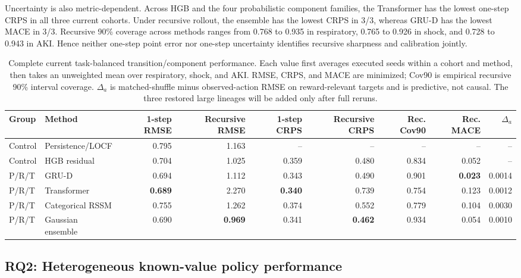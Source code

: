 \documentclass[sigconf,review]{acmart}
\begin{document}
Uncertainty is also metric-dependent. Across HGB and the four probabilistic component families, the Transformer has the lowest one-step CRPS in all three current cohorts. Under recursive rollout, the ensemble has the lowest CRPS in 3/3, whereas GRU-D has the lowest MACE in 3/3. Recursive 90\% coverage across methods ranges from 0.768 to 0.935 in respiratory, 0.765 to 0.926 in shock, and 0.728 to 0.943 in AKI. Hence neither one-step point error nor one-step uncertainty identifies recursive sharpness and calibration jointly.

\begin{table}[t]
\centering
\caption{Complete current task-balanced transition/component performance. Each value first averages executed seeds within a cohort and method, then takes an unweighted mean over respiratory, shock, and AKI. RMSE, CRPS, and MACE are minimized; Cov90 is empirical recursive 90\% interval coverage. $\Delta_a$ is matched-shuffle minus observed-action RMSE on reward-relevant targets and is predictive, not causal. The three restored large lineages will be added only after full reruns.}
\label{tab:all-models}
\scriptsize
\begin{tabular}{llrrrrrrr}
\toprule
Group & Method & 1-step RMSE & Recursive RMSE & 1-step CRPS & Recursive CRPS & Rec. Cov90 & Rec. MACE & $\Delta_a$ \\
\midrule
Control & Persistence/LOCF & 0.795 & 1.163 & -- & -- & -- & -- & -- \\
Control & HGB residual & 0.704 & 1.025 & 0.359 & 0.480 & 0.834 & 0.052 & -- \\
P/R/T & GRU-D & 0.694 & 1.112 & 0.343 & 0.490 & 0.901 & \textbf{0.023} & 0.0014 \\
P/R/T & Transformer & \textbf{0.689} & 2.270 & \textbf{0.340} & 0.739 & 0.754 & 0.123 & 0.0012 \\
P/R/T & Categorical RSSM & 0.755 & 1.262 & 0.374 & 0.552 & 0.779 & 0.104 & 0.0030 \\
P/R/T & Gaussian ensemble & 0.690 & \textbf{0.969} & 0.341 & \textbf{0.462} & 0.934 & 0.054 & 0.0010 \\
\bottomrule
\end{tabular}
\end{table}

\subsection{RQ2: Heterogeneous known-value policy performance}
\end{document}
